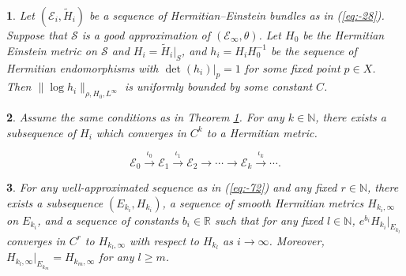 \documentclass[10pt,a4paper]{amsart}
\newtheorem{thm}{}
\def\N{\mathbb N}
\def\S{\mathcal{S}}
\begin{document}
\begin{thm}
\label{thm:Suppose-that-} Let $(\mathcal{E}_i,\tilde{H}_i)$ be a sequence of Hermitian--Einstein bundles as in (\ref{eq:-28}).   Suppose
that $\mathcal{S}$ is a good approximation of $(\mathcal{E}_{\infty},\theta)$.
Let $H_{0}$ be the Hermitian Einstein metric on $\S$ and $H_i=\tilde{H}_i|_S$, and $h_{i}=$$H_{i}H_{0}^{-1}$
be the sequence of Hermitian endomorphisms with $\det(h_i)|_p=1$ for some fixed point $p\in X$. Then $\|\log h_{i}\|_{\rho, H_0,L^{\infty}}$
is uniformly bounded by some constant $C$. 
\end{thm}

\begin{thm}
\label{thm:For-any-,}Assume the same conditions as in Theorem \ref{thm:Suppose-that-}.
For any $k\in\N$, there exists a subsequence of $H_{i}$ which converges
in $C^{k}$ to a Hermitian metric. 
\end{thm}

\begin{equation}
\mathcal{E}_{0}\overset{\iota_{0}}{\to}\mathcal{E}_{1}\overset{\iota_{1}}{\to}\mathcal{E}_{2}\to\cdots\to\mathcal{E}_{k}\overset{\iota_{k}}{\to}\cdots.\label{eq:-72}
\end{equation}

\begin{thm}
\label{thm:For-each-,}For   any  well-approximated sequence as in (\ref{eq:-72}) and any fixed $r\in\N$, there exists a subsequence
$(E_{k_{i}},H_{k_{i}})$, a sequence of smooth Hermitian metrics $H_{k_{i},\infty}$
on $E_{k_{i}}$, and a sequence of constants $b_{i}\in\mathbb{R}$
such that for any fixed $l\in\N$, $e^{b_{i}}H_{k_{i}}|_{E_{k_{l}}}$ converges
in $C^{r}$ to $H_{k_{l},\infty}$ with respect to $H_{k_l}$ as $i\to \infty$. Moreover, $H_{k_{l},\infty}|_{E_{k_{m}}}=H_{k_{m},\infty}$
for any $l\geq m$. 
\end{thm}
\end{document}
